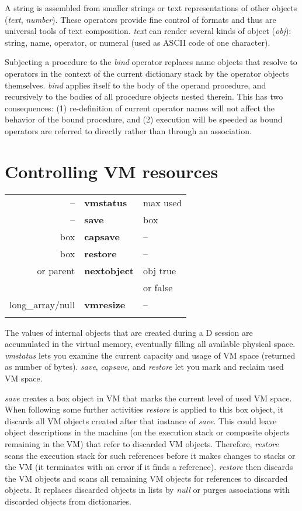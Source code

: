A  string  is assembled from smaller strings or text  representations  of other  objects (\emph{text},  \emph{number}).  These operators provide fine  control  of formats  and  thus are universal tools of text composition. \emph{text} can render several kinds of object (\emph{obj}): string, name, operator, or numeral (used as ASCII code of one character).

Subjecting  a procedure to the \emph{bind} operator replaces name  objects  that resolve to operators in the context of the current dictionary stack by the operator  objects  themselves. \emph{bind} applies itself to the  body  of  the operand procedure,  and recursively to the bodies of all procedure objects nested therein.  This has two consequences:  (1) re-definition of  current operator  names will not affect the behavior of the bound  procedure,  and (2) execution will be speeded as bound operators are referred to  directly rather than through an association.

\section{Controlling VM resources}

\begin{tabular}{>{\sffamily}r>{\sffamily\bfseries}l>{\sffamily}l}
-- & vmstatus & max used\\
-- & save & box\\
box & capsave & --\\
box & restore & --\\
0 or parent & nextobject & obj true\\
            &            & or false\\
long\_array/null  & vmresize & --\\\\

\end{tabular}

The  values of internal objects that are created during a D  session  are accumulated  in  the  virtual memory,  eventually  filling  all  available physical space. \emph{vmstatus} lets you examine the current capacity and usage of VM space (returned as number of bytes). \emph{save}, \emph{capsave}, and \emph{restore} let you mark and reclaim used VM space.

\emph{save} creates a box object in VM that marks the current level of used VM space. When following some further activities \emph{restore} is applied to this box object, it discards all VM objects created after that instance of \emph{save}. This could leave object descriptions in the machine (on the execution stack or composite objects remaining in the VM) that refer to discarded VM objects. Therefore, \emph{restore} scans the execution stack for such references before it makes changes to stacks or the VM (it terminates with an error if it finds a reference). \emph{restore} then discards the VM objects and scans all remaining VM objects for references to discarded objects. It replaces discarded objects in lists by \emph{null} or purges associations with discarded objects from dictionaries.

